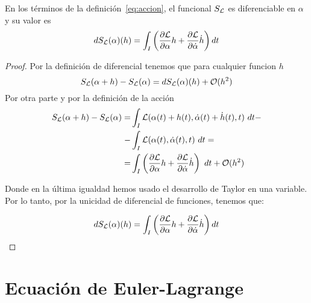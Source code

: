 \begin{proposition}
	En los términos de la definición~\eqref{eq:accion}, el funcional $S_{\mathcal{L}}$ es diferenciable en $\alpha$ y su valor es
	\begin{equation}
		\label{eq:accion_diferencial}
		dS_{\mathcal{L}}(\alpha)(h)=\int_{I}\left( \frac{\partial \mathcal{L}}{\partial\alpha}h+\frac{\partial \mathcal{L}}{\partial\dot{\alpha}}\dot{h}\right) dt
	\end{equation}
\end{proposition}
\begin{proof}
	Por la definición de diferencial tenemos que para cualquier funcion $h$
	\begin{equation*}
		S_{\mathcal{L}}(\alpha + h) -  S_{\mathcal{L}}(\alpha) = dS_{\mathcal{L}}(\alpha)(h) +\mathcal{O}(h^2)
	\end{equation*}
	Por otra parte y por la definición de la acción
	\begin{equation*}
		\begin{split}
			S_\lagrangiano(\alpha + h) -  S_\lagrangiano(\alpha) = & \int_{I}\lagrangiano(\alpha(t)+h(t), \dot{\alpha}(t)+\dot{h}(t), t)\ dt - \\
			- & \int_{I}\lagrangiano(\alpha(t), \dot{\alpha}(t), t)\ dt =\\
			=& \int_{I}\left( \frac{\partial \lagrangiano}{\partial\alpha}h+\frac{\partial \lagrangiano}{\partial\dot{\alpha}}\dot{h}\right)\ dt+\mathcal{O}(h^2)
		\end{split}
	\end{equation*}

	Donde en la última igualdad hemos usado el desarrollo de Taylor en una variable.
	Por lo tanto, por la unicidad de diferencial de funciones, tenemos que:

	\begin{equation*}
		dS_{\mathcal{L}}(\alpha)(h) =\int_{I}\left( \frac{\partial \mathcal{L}}{\partial\alpha}h+\frac{\partial \mathcal{L}}{\partial\dot{\alpha}}\dot{h}\right) dt
	\end{equation*}

\end{proof}

\section{Ecuación de Euler-Lagrange}\label{sec:ecuacion-de-euler-lagrange}


